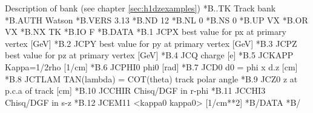 \begin{XMPt}{Description of  bank (see chapter \ref{sec:h1dzexamples})}
*B..TK     Track bank
*B.AUTH    Watson
*B.VERS    3.13
*B.ND      12
*B.NL      0
*B.NS      0
*B.UP      VX
*B.OR      VX
*B.NX      TK
*B.IO      F
*B.DATA
*B.1      JCPX       best value for px at primary vertex    [GeV]
*B.2      JCPY       best value for py at primary vertex    [GeV]
*B.3      JCPZ       best value for pz at primary vertex    [GeV]
*B.4      JCQ        charge                                 [e]
*B.5      JCKAPP     Kappa=1/2rho                           [1/cm]
*B.6      JCPHI0     phi0                                   [rad]
*B.7      JCD0       d0 = phi x d.z                         [cm]
*B.8      JCTLAM     TAN(lambda) = COT(theta) track polar angle
*B.9      JCZ0       z at p.c.a of track                    [cm]
*B.10     JCCHIR     Chisq/DGF in r-phi
*B.11     JCCHI3     Chisq/DGF in s-z
*B.12     JCEM11     <kappa0 kappa0>                    [1/cm**2]
*B/DATA
*B/
\end{XMPt}
